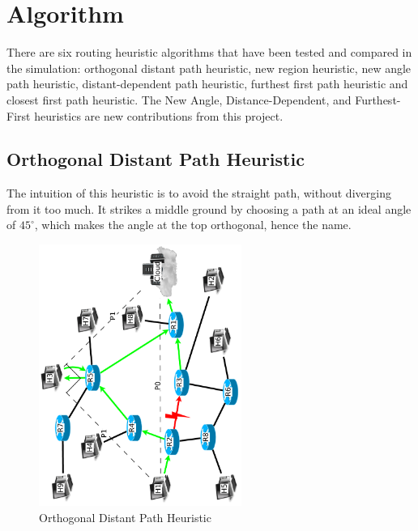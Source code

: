 \documentclass[conference]{IEEEtran}
\begin{document}


\section{Algorithm}
There are six routing heuristic algorithms that have been tested and compared in the simulation: orthogonal distant path heuristic, new region heuristic, new angle path heuristic, distant-dependent path heuristic, furthest first path heuristic and closest first path heuristic.
The New Angle, Distance-Dependent, and Furthest-First heuristics are new contributions from this project.

%
\subsection{Orthogonal Distant Path Heuristic}
The intuition of this heuristic is to avoid the straight path, without diverging from it too much.  It strikes a middle ground by choosing a path at an ideal angle of $45^{\circ}$, which makes the angle at the top orthogonal, hence the name.
\begin{algorithm}
\DontPrintSemicolon
{}
\SetAlgoLined
\SetAlgoLongEnd
\scriptsize
{}
\caption{}
\small
\end{algorithm}

\begin{figure}
\centering
\includegraphics[width=2.6in,angle=-90]{../../images/diagrams/angular_path}
\caption{Orthogonal Distant Path Heuristic}
\end{figure}
\end{document}
